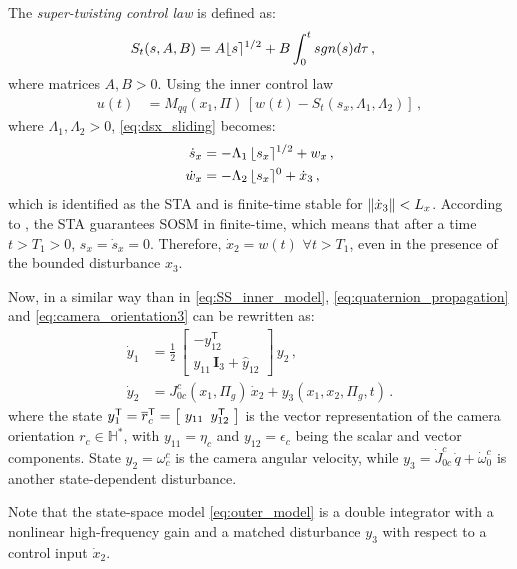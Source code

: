 The {\it super-twisting control law} is defined as:
%
\begin{align}
S_t(s,A,B) &= A \lfloor s \rceil^{1/2} + B \int^{t}_{0}{sgn(s) d\tau} \,, 
\label{eq:st_ctrl}
\end{align}
%
where matrices $A, B > 0$.
%
Using the inner control law
%
\begin{align}
u(t) &= M_{qq}(x_1,\Pi) \, \left[ w(t) - S_t(s_x,\Lambda_1,\Lambda_2) \right] \,,
\label{eq:u_sliding}
\end{align}
%
where $\Lambda_1,\Lambda_2 > 0$, \eqref{eq:dsx_sliding} becomes:
%
\begin{align}
\dot{s}_x &= - \Lambda_1 \, \lfloor s_x \rceil^{1/2} + w_x \,, \nonumber \\
\dot{w}_x &= - \Lambda_2 \, \lfloor s_x \rceil^{0} + \dot{x}_3 \,,
\label{eq:STC_system}
\end{align}
%
which is identified as the STA and is finite-time stable for $\left\lVert\dot{x}_3\right\rVert < L_x$.
%
According to \cite{Moreno2012}, the STA guarantees SOSM in finite-time, which means that after a time $t>T_1>0$, $s_x = \dot{s}_x = 0$. Therefore, $\dot{x}_2 = w(t) \,\, \forall t>T_1$, even in the presence of the bounded disturbance $x_3$.

Now, in a similar way than in \eqref{eq:SS_inner_model}, \eqref{eq:quaternion_propagation} and \eqref{eq:camera_orientation3} can be rewritten as:
%
\begin{align}
\dot{y}_{1} &= \frac{1}{2} \, \left[ \begin{array}{cc}
- y_{12}^\mathsf{T} \\
y_{11}\,\mathbf{I}_3 + \widehat{y}_{12}
\end{array} \right] \, y_2 \,, \\
\dot{y}_2 &= J^{c}_{0c}(x_1,\Pi_g) \, \dot{x}_2 + y_3(x_1,x_2,\Pi_g,t) \,.
\label{eq:outer_model}
\end{align}
%
where the state $y^\mathsf{T}_1 = \overline{r}^\mathsf{T}_c = \begin{bmatrix}\,\,y_{11} \,\,\, y^\mathsf{T}_{12}\,\,\end{bmatrix}$ is the vector representation of the camera orientation $r_c \in \mathbb{H}^*$, with $y_{11} = \eta_c$ and $y_{12} = \epsilon_c$ being the scalar and vector components. 
%
State $y_2 = \omega^c_{c}$ is the camera angular velocity, while $y_3 = \dot{J}^c_{0c}\,\dot{q} + \dot{\omega}^c_{0}$ is another state-dependent disturbance.
%
\begin{remark}
Note that the state-space model \eqref{eq:outer_model} is a double integrator with a nonlinear high-frequency gain and a matched disturbance $y_3$ with respect to a control input $\dot{x}_2$.
\end{remark}

